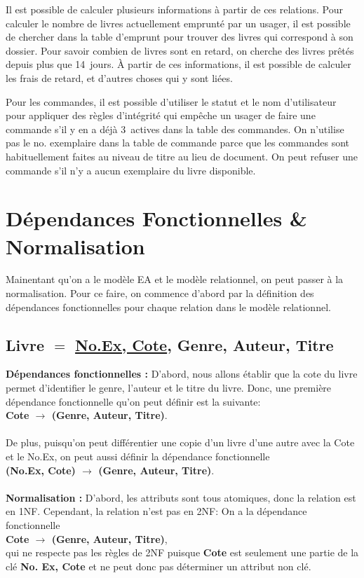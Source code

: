 \documentclass[12pt]{article}
\begin{document}
Il est possible de calculer plusieurs informations à partir de ces relations. Pour calculer le nombre de livres actuellement
emprunté par un usager, il est possible de chercher dans la table d'emprunt pour trouver des livres qui correspond
à son dossier. Pour savoir combien de livres sont en retard, on cherche des livres prêtés depuis plus que 14~jours. 
À partir de ces informations, il est possible de calculer les frais de retard, et d'autres choses qui y sont liées.

Pour les commandes, il est possible d'utiliser le statut et le nom d'utilisateur pour appliquer des règles d'intégrité
qui empêche un usager de faire une commande s'il y en a déjà 3~actives dans la table des commandes. On n'utilise pas le no. exemplaire
dans la table de commande parce que les commandes sont habituellement faites au niveau de titre au lieu de document. On peut
refuser une commande s'il n'y a aucun exemplaire du livre disponible. 



\section*{Dépendances Fonctionnelles \& Normalisation}

Mainentant qu'on a le modèle EA et le modèle relationnel, on peut passer à la normalisation. 
Pour ce faire, on commence d'abord par la définition des dépendances fonctionnelles pour chaque 
relation dans le modèle relationnel. 

\subsection*{\textbf{Livre} $=$ \underline{No.Ex, Cote}, Genre, Auteur, Titre}
   
\textbf{Dépendances fonctionnelles :} D'abord, nous allons établir que la cote du livre permet 
d'identifier le genre, l'auteur et le titre du livre. 
Donc, une première dépendance fonctionnelle qu'on peut définir est la suivante: \\ 
\textbf{Cote $\rightarrow$ (Genre, Auteur, Titre)}. \\  \\
De plus, puisqu'on peut différentier une copie d'un livre d'une autre avec la Cote et le No.Ex, 
on peut aussi définir la dépendance fonctionnelle \\
\textbf{(No.Ex, Cote) $\rightarrow$ (Genre, Auteur, Titre)}. \\
\\
\textbf{Normalisation :} D'abord, les attributs sont tous atomiques, donc la relation est en 1NF. 
Cependant, la relation n'est pas en 2NF: On a la dépendance fonctionnelle \\
\textbf{Cote $\rightarrow$ (Genre, Auteur, Titre)},\\
qui ne respecte pas les règles de 2NF puisque \textbf{Cote} est seulement une partie de la clé \textbf{No. Ex, Cote} 
et ne peut donc pas déterminer un attribut non clé. 
\end{document}
